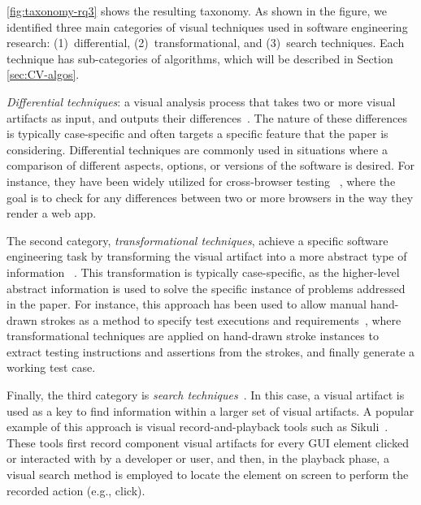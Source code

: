 \autoref{fig:taxonomy-rq3} shows the resulting taxonomy.
As shown in the figure, we identified three main categories
of visual techniques used in software engineering research:
(1)~differential, (2)~transformational, and (3)~search techniques.
Each technique has sub-categories of algorithms, which will be described in Section \ref{sec:CV-algos}.


\emph{Differential techniques}: a visual analysis process that takes  two or more visual artifacts as input, and outputs their differences~\cite{Delamaro-2011-STVR,Choudhary-2012-ICST,
Choudhary-2010-ICSM,Alegroth-2013-ICST,Choudhary-2013-ICSE,Lin-2014-TSE,Mahajan-2014-ASE,
Amalfitano-2014-WISE,Selay-2014-DICTA,Burg-2015-UIST,Mahajan-2015-ICST,Hori-2015-SEKE,
Mahajan-2016-ICST,Feng-2016-ASE,Deka-2017-UIST,He-2016-ICWS,Kirac-2018-JSS,Xu-2018-TOIT}. 
The nature of these differences is typically case-specific and often targets a specific
feature that the paper is considering.
Differential techniques are commonly used in situations where a comparison of different aspects,
options, or versions of the software is desired.
For instance, they have been widely utilized for cross-browser testing
~\cite{Xu-2018-TOIT, Choudhary-2010-ICSM, He-2016-ICWS, Choudhary-2012-ICST, Selay-2014-DICTA},
where the goal is to check for any differences between two or more browsers in the way they 
render a web app.

The second category, \emph{transformational techniques}, achieve a specific software engineering task
by transforming the visual artifact into a more abstract type of information
~\cite{Scharf-2013-ICSE,Semenenko-2013-ICSM,Nguyen-2015-ASE,Deka-2016-UIST,Ponzanelli-2016-ICSE,
Patric-2016-ASE,Wan-2017-STVR,Bao-2017-EMSE,Zhang-2017-ASE,Reiss-2018-ASEj,canvas_icst2018,Kuchta-2018-EMSE}.
This transformation is typically case-specific, as the higher-level abstract information
is used to solve the specific instance of problems addressed in the paper.
For instance, this approach has been used to allow manual hand-drawn strokes as a method to specify
test executions and requirements~\cite{Scharf-2013-ICSE},
where transformational techniques are applied on hand-drawn stroke instances to extract testing
instructions and assertions from the strokes, and finally generate a working test case.

Finally, the third category is \emph{search techniques}~\cite{Chang-2010-CHI, Li-2010-CHI,Chen-2017-IUI,Leotta-2018-STVR}.
In this case, a visual artifact is used as a key to find information within a larger set of visual artifacts.
A popular example of this approach is visual record-and-playback tools such as Sikuli~\cite{Chang-2010-CHI}.
These tools first record component visual artifacts for every GUI element clicked or interacted with
by a developer or user, and then, in the playback phase, a visual search method is employed to locate
the element on screen to perform the recorded action (e.g., click).

